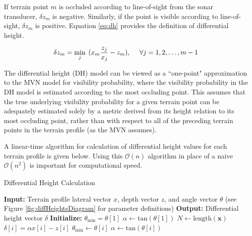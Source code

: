 If terrain point $m$ is occluded according to line-of-sight from the sonar transducer, $\delta z_m$ is negative.  Similarly, if the point is visible according to line-of-sight, $\delta z_m$ is positive.
Equation \ref{eq:dh} provides the definition of differential height.  

\begin{equation}
\delta z_m =  \underset{j}{\text{min}} \hspace{1ex} ( x_m \frac{z_j}{x_j} - z_m ) , \hspace{3ex} \forall j = 1, 2, \hdots, m-1
\label{eq:dh}
\end{equation}

The differential height (DH) model can be viewed as a ``one-point" approximation to the MVN model for visibility probability, where the visibility probability in the DH model is estimated according to the most occluding point.  This assumes that the true underlying visibility probability for a given terrain point can be adequately estimated solely by a metric derived from its height relation to its most occluding point, rather than with respect to all of the preceding terrain points in the terrain profile (as the MVN assumes).

A linear-time algorithm for calculation of differential height values for each terrain profile is given below.
Using this $\mathcal{O}(n)$ algorithm in place of a naive $\mathcal{O}(n^2)$ is important for computational speed.

\begin{algorithm}
\caption{Differential Height Calculation}
\begin{algorithmic}
\State \textbf{Input: } Terrain profile lateral vector $x$, depth vector $z$, and angle vector $\theta$ (see Figure \ref{fig:diffHeightsDiagram} for parameter definitions)
\State \textbf{Output: } Differential height vector $\delta$
\State \textbf{Initialize: } 
\State $\theta_{\text{min}} = \theta[1]$
\State $\alpha \gets \text{tan}(\theta[1]) $
\State $N \gets \text{length}(\textbf{x}) $ 
\\
\State $\delta[i] = \alpha x[i] - z[i]$
\State $\theta_{\text{min}} \gets \theta[i]$
\State $\alpha \gets \text{tan}(\theta[i])$
\EndIf
\EndFor
\end{algorithmic}
\label{alg:dh}
\end{algorithm}

